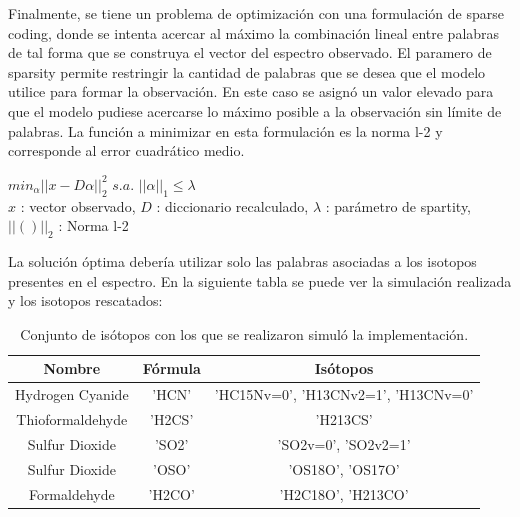 Finalmente, se tiene un problema de optimización con una formulación de sparse coding, donde se intenta acercar  al máximo la combinación lineal entre palabras de tal forma que se construya el vector del espectro observado. El paramero de sparsity permite restringir la cantidad de palabras que se desea que el modelo utilice para formar la observación. En este caso se asignó un valor elevado para que el modelo pudiese acercarse lo máximo posible a la observación sin límite de palabras.  La función a minimizar en esta formulación es la norma l-2 y corresponde al error cuadrático medio.


\begin{center}
$min_{\alpha} ||x-D\alpha||_2^2$ 
$s.a.$ 
$||\alpha||_1 \leq \lambda$ \\
$x$ : vector observado, 
$D$ : diccionario recalculado, 
$\lambda$ : parámetro de spartity, 
$||()||_2$ : Norma l-2
\end{center}


La solución óptima debería utilizar solo las palabras asociadas a los isotopos presentes en el espectro. En la siguiente tabla se puede ver la simulación realizada y los isotopos rescatados:

\begin {table}[H]
\begin{center}
	\begin{tabular}{|c|c|c|}
		\hline Nombre & Fórmula &  Isótopos \\ 
		

		\hline	Hydrogen Cyanide & 'HCN' & 'HC15Nv=0', 'H13CNv2=1', 'H13CNv=0'\\ 
		
		\hline	Thioformaldehyde & 'H2CS' & 'H213CS' \\
		
		\hline	Sulfur Dioxide & 'SO2' & 'SO2v=0', 'SO2v2=1' \\
		
		\hline	Sulfur Dioxide & 'OSO' & 'OS18O', 'OS17O' \\
		
		\hline	Formaldehyde & 'H2CO'  & 'H2C18O', 'H213CO' \\
				
		\hline 
	\end{tabular}
	\caption {Conjunto de isótopos con los que se realizaron simuló la implementación.}
\end{center}
\end{table}

